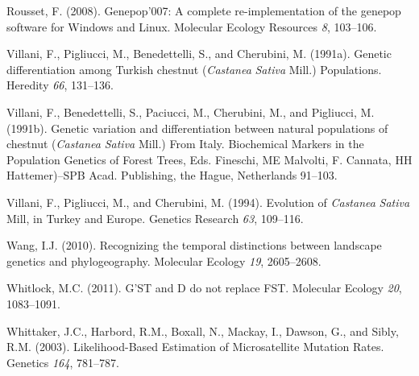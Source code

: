 \documentclass[12pt,a4paper,]{report}
\begin{document}
\leavevmode\hypertarget{ref-Rousset2008}{}%
Rousset, F. (2008). Genepop'007: A complete re-implementation of the
genepop software for Windows and Linux. Molecular Ecology Resources
\emph{8}, 103--106.

\leavevmode\hypertarget{ref-Villani1991}{}%
Villani, F., Pigliucci, M., Benedettelli, S., and Cherubini, M. (1991a).
Genetic differentiation among Turkish chestnut (\emph{Castanea}
\emph{Sativa} Mill.) Populations. Heredity \emph{66}, 131--136.

\leavevmode\hypertarget{ref-villani1991genetic}{}%
Villani, F., Benedettelli, S., Paciucci, M., Cherubini, M., and
Pigliucci, M. (1991b). Genetic variation and differentiation between
natural populations of chestnut (\emph{Castanea} \emph{Sativa} Mill.)
From Italy. Biochemical Markers in the Population Genetics of Forest
Trees, Eds. Fineschi, ME Malvolti, F. Cannata, HH Hattemer)--SPB Acad.
Publishing, the Hague, Netherlands 91--103.

\leavevmode\hypertarget{ref-villani1994evolution}{}%
Villani, F., Pigliucci, M., and Cherubini, M. (1994). Evolution of
\emph{Castanea} \emph{Sativa} Mill, in Turkey and Europe. Genetics
Research \emph{63}, 109--116.

\leavevmode\hypertarget{ref-Wang2010a}{}%
Wang, I.J. (2010). Recognizing the temporal distinctions between
landscape genetics and phylogeography. Molecular Ecology \emph{19},
2605--2608.

\leavevmode\hypertarget{ref-whitlock_gst_2011}{}%
Whitlock, M.C. (2011). G'ST and D do not replace FST. Molecular Ecology
\emph{20}, 1083--1091.

\leavevmode\hypertarget{ref-whittaker_likelihood-based_2003}{}%
Whittaker, J.C., Harbord, R.M., Boxall, N., Mackay, I., Dawson, G., and
Sibly, R.M. (2003). Likelihood-Based Estimation of Microsatellite
Mutation Rates. Genetics \emph{164}, 781--787.
\end{document}

